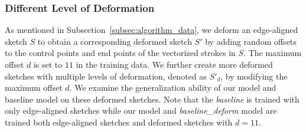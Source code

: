 \subsubsection{Different Level of Deformation}
As mentioned in Subsection~\ref{subsec:algorithm_data}, we deform an edge-aligned sketch $S$ to obtain a corresponding deformed sketch $S'$ by adding random offsets to the control points and end points of the vectorized strokes in $S$. 
The maximum offset $d$ is set to $11$ in the training data. 
We further create more deformed sketches with multiple levels of deformation, denoted as $S'_d$, by modifying the maximum offset $d$.
%
We examine the generalization ability of our model and baseline model on these deformed sketches. 
Note that the \textit{baseline} is trained with only edge-aligned sketches while our model and \textit{baseline\_deform} model are trained both edge-aligned sketches and deformed sketches with $d=11$.

